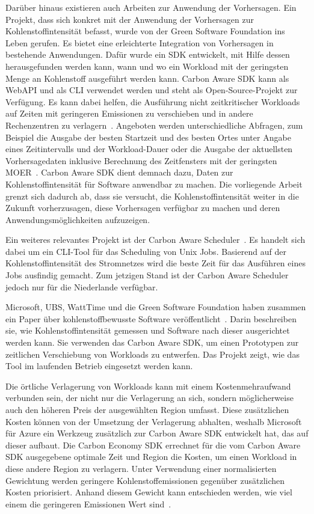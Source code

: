 Darüber hinaus existieren auch Arbeiten zur Anwendung der Vorhersagen.
Ein Projekt, dass sich konkret mit der Anwendung der Vorhersagen zur Kohlenstoffintensität befasst, wurde von der Green Software Foundation ins Leben gerufen.
Es bietet eine erleichterte Integration von Vorhersagen in bestehende Anwendungen.
Dafür wurde ein \ac{SDK} entwickelt, mit Hilfe dessen herausgefunden werden kann, wann und wo ein Workload mit der geringsten Menge an Kohlenstoff ausgeführt werden kann.
Carbon Aware \ac{SDK} kann als Web\ac{API} und als \ac{CLI} verwendet werden und steht als Open-Source-Projekt zur Verfügung.
Es kann dabei helfen, die Ausführung nicht zeitkritischer Workloads auf Zeiten mit geringeren Emissionen zu verschieben und in andere Rechenzentren zu verlagern~\cite{GreenSoftwareFoundation.20231212T09:58:27.000Z}.
Angeboten werden unterschiedliche Abfragen, zum Beispiel die Ausgabe der besten Startzeit und des besten Ortes unter Angabe eines Zeitintervalls und der Workload-Dauer oder die Ausgabe der aktuellsten Vorhersagedaten inklusive Berechnung des Zeitfensters mit der geringsten \ac{MOER}~\cite{GreenSoftwareFoundation.20240316T16:54:58.000Z}.
Carbon Aware \ac{SDK} dient demnach dazu, Daten zur Kohlenstoffintensität für Software anwendbar zu machen.
Die vorliegende Arbeit grenzt sich dadurch ab, dass sie versucht, die Kohlenstoffintensität weiter in die Zukunft vorherzusagen, diese Vorhersagen verfügbar zu machen und deren Anwendungsmöglichkeiten aufzuzeigen.

Ein weiteres relevantes Projekt ist der Carbon Aware Scheduler~\cite{Siemers.20240319T14:09:25.000Z}.
Es handelt sich dabei um ein \ac{CLI}-Tool für das Scheduling von Unix Jobs.
Basierend auf der Kohlenstoffintensität des Stromnetzes wird die beste Zeit für das Ausführen eines Jobs ausfindig gemacht.
Zum jetzigen Stand ist der Carbon Aware Scheduler jedoch nur für die Niederlande verfügbar.

Microsoft, UBS, WattTime und die Green Software Foundation haben zusammen ein Paper über kohlenstoffbewusste Software veröffentlicht~\cite{Buchanan.2023}.
Darin beschreiben sie, wie Kohlenstoffintensität gemessen und Software nach dieser ausgerichtet werden kann.
Sie verwenden das Carbon Aware \ac{SDK}, um einen Prototypen zur zeitlichen Verschiebung von Workloads zu entwerfen.
Das Projekt zeigt, wie das Tool im laufenden Betrieb eingesetzt werden kann.

Die örtliche Verlagerung von Workloads kann mit einem Kostenmehraufwand verbunden sein, der nicht nur die Verlagerung an sich, sondern möglicherweise auch den höheren Preis der ausgewählten Region umfasst.
Diese zusätzlichen Kosten können von der Umsetzung der Verlagerung abhalten, weshalb Microsoft für Azure ein Werkzeug zusätzlich zur Carbon Aware \ac{SDK} entwickelt hat, das auf dieser aufbaut.
Die Carbon Economy \ac{SDK} errechnet für die vom Carbon Aware \ac{SDK} ausgegebene optimale Zeit und Region die Kosten, um einen Workload in diese andere Region zu verlagern.
Unter Verwendung einer normalisierten Gewichtung werden geringere Kohlenstoffemissionen gegenüber zusätzlichen Kosten priorisiert.
Anhand diesem Gewicht kann entschieden werden, wie viel einem die geringeren Emissionen Wert sind~\cite{Norlander.2023}.

